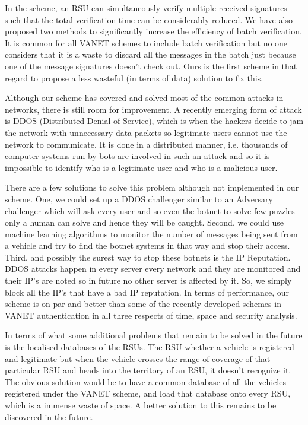 \documentclass[10pt,journal,letterpaper]{IEEEtran}
\begin{document}
In the scheme, an RSU can simultaneously verify multiple received
signatures such that the total verification time can be considerably
reduced. We have also proposed two methods to significantly increase
the efficiency of batch verification. It is common for all VANET
schemes to include batch verification but no one considers that it
is a waste to discard all the messages in the batch just because one
of the message signatures doesn’t check out. Ours is the first
scheme in that regard to propose a less wasteful (in terms of data)
solution to fix this.

Although our scheme has covered and solved most of the common
attacks in networks, there is still room for improvement. A recently
emerging form of attack is DDOS (Distributed Denial of Service),
which is when the hackers decide to jam the network with unnecessary
data packets so legitimate users cannot use the network to
communicate. It is done in a distributed manner, i.e. thousands of
computer systems run by bots are involved in such an attack and so
it is impossible to identify who is a legitimate user and who is a
malicious user.

There are a few solutions to solve this problem although not
implemented in our scheme. One, we could set up a DDOS challenger
similar to an Adversary challenger which will ask every user and so
even the botnet to solve few puzzles only a human can solve and
hence they will be caught. Second, we could use machine learning
algorithms to monitor the number of messages being sent from a
vehicle and try to find the botnet systems in that way and stop
their access. Third, and possibly the surest way to stop these
botnets is the IP Reputation. DDOS attacks happen in every server
every network and they are monitored and their IP’s are noted so
in future no other server is affected by it. So, we simply block all
the IP’s that have a bad IP reputation. In terms of performance,
our scheme is on par and better than some of the recently developed
schemes in VANET authentication in all three respects of time, space
and security analysis.

In terms of what some additional problems that remain to be solved
in the future is the localised databases of the RSUs. The RSU
whether a vehicle is registered and legitimate but when the vehicle
crosses the range of coverage of that particular RSU and heads into
the territory of an RSU, it doesn’t recognize it. The obvious
solution would be to have a common database of all the vehicles
registered under the VANET scheme, and load that database onto every
RSU, which is a immense waste of space. A better solution to this
remains to be discovered in the future.




\end{document}
